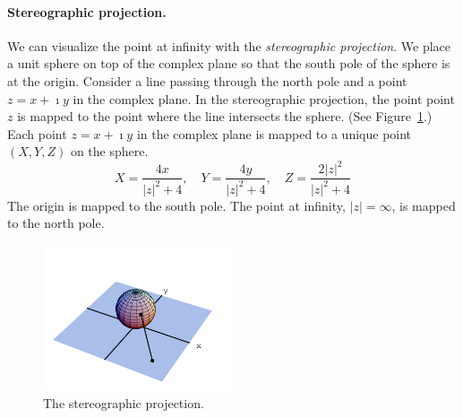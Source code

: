 \paragraph{Stereographic projection.}
We can visualize the point at infinity with the 
\textit{stereographic projection}.  We place a unit 
sphere on top of the complex plane so that the south pole of the sphere
is at the origin.  Consider a line passing through the north pole and 
a point $z = x + \imath y$ in the complex plane.  In the stereographic projection,
the point point $z$ is mapped to the point where the line intersects 
the sphere.  (See Figure~\ref{figure stereographic-projection}.)  Each
point $z = x + \imath y$ in the complex plane is mapped to a unique point 
$(X, Y, Z)$ on the sphere.
\[
X = \frac{4 x}{|z|^2 + 4}, \quad
Y = \frac{4 y}{|z|^2 + 4}, \quad
Z = \frac{2 |z|^2}{|z|^2 + 4}
\]
The origin is mapped to the south pole.  The point at infinity, $|z| = \infty$,
is mapped to the north pole.


\begin{figure}[htbp!]
  \begin{center}
      \includegraphics[width=0.5\textwidth]{fcv/function/stereographic-projection}
  \end{center}
  \caption{The stereographic projection.}
  \label{figure stereographic-projection}
\end{figure}



